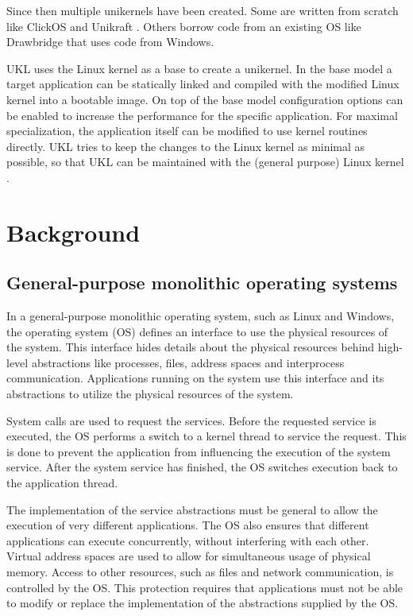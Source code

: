 \documentclass[10pt,twocolumn,a4paper]{article}
\begin{document}
  Since then multiple unikernels have been created. Some are written from scratch like
  ClickOS \cite{martins2014} and Unikraft \cite{kuenzer21}.
  Others borrow code from an existing OS like Drawbridge \cite{porter11} 
  that uses code from Windows.

  UKL uses the Linux kernel as a base to create a unikernel.
  In the base model a target application can be statically linked and compiled with
  the modified Linux kernel into a bootable image.
  On top of the base model configuration options can be enabled to increase the performance
  for the specific application.
  For maximal specialization, the application itself can be modified to use kernel routines
  directly.
  UKL tries to keep the changes to the Linux kernel as minimal as possible,
  so that UKL can be maintained with the (general purpose) Linux kernel \cite{raza23}.
  

\section{Background}\label{sec:background}
  \subsection{General-purpose monolithic operating systems}
    In a general-purpose monolithic operating system, such as Linux and Windows,
    the operating system (OS) defines an interface to use the physical resources
    of the system. 
    This interface hides details about the physical resources behind
    high-level abstractions like processes, files, address spaces 
    and interprocess communication.
    Applications running on the system use this interface and its abstractions
    to utilize the physical resources of the system.

    System calls are used to request the services.
    Before the requested service is executed, the OS performs a switch to a kernel thread
    to service the request.
    This is done to prevent the application from influencing the execution of the system service.
    After the system service has finished, the OS switches execution back to the application thread.

    The implementation of the service abstractions must be general to allow the execution 
    of very different applications.
    The OS also ensures that different applications can execute concurrently, 
    without interfering with each other. 
    Virtual address spaces are used to allow for simultaneous usage of physical memory.
    Access to other resources, such as files and network communication, is controlled
    by the OS.
    This protection requires that applications must not be able
    to modify or replace the implementation of the abstractions supplied by the OS.
\end{document}
